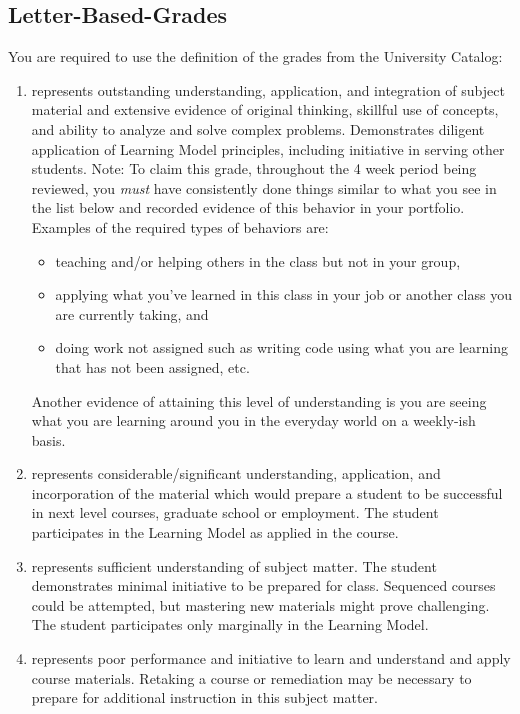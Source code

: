 \documentclass[12pt]{amsart}
\begin{document}
\subsection{Letter-Based-Grades}You are required to use the definition of the grades from the University Catalog:
\begin{enumerate}[label=\textbf{\Alph*}]
	\item represents outstanding understanding, application, and integration of subject material and extensive evidence of original thinking, skillful use of concepts, and ability to analyze and solve complex problems. Demonstrates diligent application of Learning Model principles, including initiative in serving other students.
	Note: To claim this grade, throughout the 4 week period being reviewed, you \textit{must} have consistently done things similar to what you see in the list below  and recorded evidence of this behavior in your portfolio. 
Examples of the required types of behaviors are:
\begin{itemize}  
\item teaching and/or helping others in the class but not in your group,
\item applying what you've learned in this class in your job or another class you are currently taking, and
\item doing work not assigned such as writing code using what you are learning that has not been assigned, etc.
\end{itemize}
Another evidence of attaining this level of understanding is you are seeing what you are learning around you in the everyday world on a weekly-ish basis.

	\item represents considerable/significant understanding, application, and incorporation of the material which would prepare a student to be successful in next level courses, graduate school or employment. The student participates in the Learning Model as applied in the course. 
	\item represents sufficient understanding of subject matter. The student demonstrates minimal initiative to be prepared for class. Sequenced courses could be attempted, but mastering new materials might prove challenging. The student participates only marginally in the Learning Model.
	\item represents poor performance and initiative to learn and understand and apply course materials. Retaking a course or remediation may be necessary to prepare for additional instruction in this subject matter. 
\end{enumerate}
\end{document}
